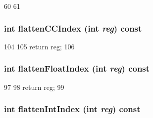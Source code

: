 \begin{DoxyCode}
60     {
61     }
\end{DoxyCode}
\hypertarget{classPowerISA_1_1ISA_a7a5d7476bd10e5af09e6e753d1fca087}{
\subsubsection[{flattenCCIndex}]{\setlength{\rightskip}{0pt plus 5cm}int flattenCCIndex (int {\em reg}) const}}
\label{classPowerISA_1_1ISA_a7a5d7476bd10e5af09e6e753d1fca087}



\begin{DoxyCode}
104     {
105         return reg;
106     }
\end{DoxyCode}
\hypertarget{classPowerISA_1_1ISA_a85addcd4f57c5a0ffa81805dcad1eeb7}{
\subsubsection[{flattenFloatIndex}]{\setlength{\rightskip}{0pt plus 5cm}int flattenFloatIndex (int {\em reg}) const}}
\label{classPowerISA_1_1ISA_a85addcd4f57c5a0ffa81805dcad1eeb7}



\begin{DoxyCode}
97     {
98         return reg;
99     }
\end{DoxyCode}
\hypertarget{classPowerISA_1_1ISA_aece4b88ffcab608652e8e9f0fbe643d4}{
\subsubsection[{flattenIntIndex}]{\setlength{\rightskip}{0pt plus 5cm}int flattenIntIndex (int {\em reg}) const}}
\label{classPowerISA_1_1ISA_aece4b88ffcab608652e8e9f0fbe643d4}



